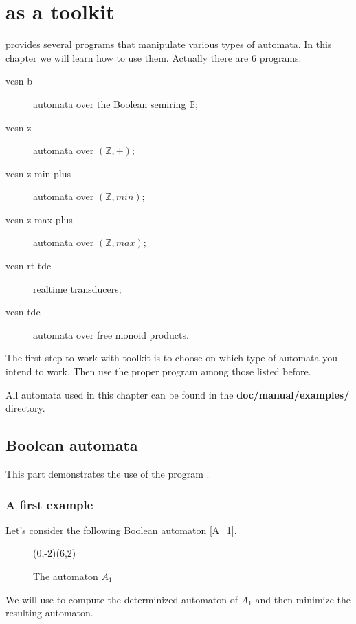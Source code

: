 \chapter{\Vauc as a toolkit}

\Vauc provides several programs that manipulate various types of
automata. In this chapter we will learn how to use them.  Actually
there are 6 programs:
\begin{description}
\item [vcsn-b] automata over the Boolean semiring $\mathbb{B}$;
\item [vcsn-z] automata over $(\mathbb{Z},+)$;
\item [vcsn-z-min-plus] automata over $(\mathbb{Z},min)$;
\item [vcsn-z-max-plus] automata over $(\mathbb{Z},max)$;
\item [vcsn-rt-tdc] realtime transducers;
\item [vcsn-tdc] automata over free monoid products.
\end{description}

The first step to work with \Vauc toolkit is to choose on which type
of automata you intend to work. Then use the proper program among
those listed before.

All automata used in this chapter can be found in the
\textbf{doc/manual/examples/} directory.

\newpage

\section{Boolean automata}

This part demonstrates the use of the program .

\subsection{A first example}

Let's consider the following Boolean automaton \autoref{A_1}.
\begin{figure}[ht] \centering
  \begin{VCPicture}{(0,-2)(6,2)}
      
     
     
       
  \end{VCPicture}
  \caption{The automaton $A_1$}
  \label{A_1}
\end{figure}
We will use \Vauc to compute the determinized automaton of $A_1$ and
then minimize the resulting automaton.


